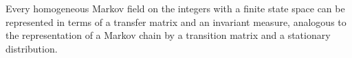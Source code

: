 Every homogeneous Markov field on the integers with a finite state space can be represented in terms of a transfer matrix and an invariant measure, analogous to the representation of a Markov chain by a transition matrix and a stationary distribution.